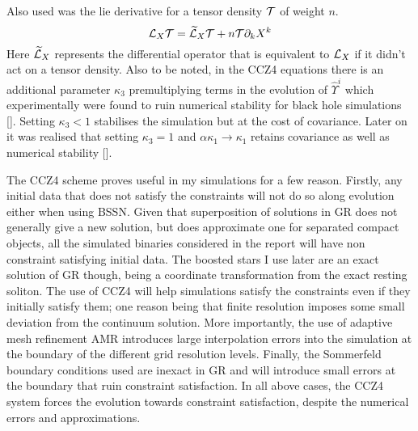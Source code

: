Also used was the lie derivative for a tensor density $\mathcal{T}$ of weight $n$.\begin{equation} \mathcal{L}_X \mathcal{T} = \widetilde{\mathcal{L}}_X \mathcal{T} + n\mathcal{T} \partial_k X^k\end{equation}
Here $ \widetilde{\mathcal{L}}_X$ represents the differential operator that is equivalent to $\mathcal{L}_X$ if it didn't act on a tensor density. Also to be noted, in the CCZ4 equations there is an additional parameter $\kappa_3$ premultiplying terms in the evolution of $\hat{\Upsilon}^i$ which experimentally were found to ruin numerical stability for black hole simulations []. Setting $\kappa_3<1$ stabilises the simulation but at the cost of covariance. Later on it was realised that setting $\kappa_3=1$ and $\alpha\kappa_1\rightarrow\kappa_1$ retains covariance as well as numerical stability [].

The CCZ4 scheme proves useful in my simulations for a few reason. Firstly, any initial data that does not satisfy the constraints will not do so along evolution either when using BSSN. Given that superposition of solutions in GR does not generally give a new solution, but does approximate one for separated compact objects, all the simulated binaries considered in the report will have non constraint satisfying initial data. The boosted stars I use later are an exact solution of GR though, being a coordinate transformation from the exact resting soliton. The use of CCZ4 will help simulations satisfy the constraints even if they initially satisfy them; one reason being that finite resolution imposes some small deviation from the continuum solution. More importantly, the use of adaptive mesh refinement AMR introduces large interpolation errors into the simulation at the boundary of the different grid resolution levels. Finally, the Sommerfeld boundary conditions used are inexact in GR and will introduce small errors at the boundary that ruin constraint satisfaction. In all above cases, the CCZ4 system forces the evolution towards constraint satisfaction, despite the numerical errors and approximations.


